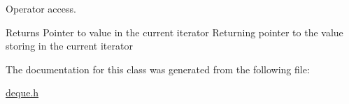 Operator access. 

\begin{DoxyReturn}{Returns}
Pointer to value in the current iterator Returning pointer to the value storing in the current iterator 
\end{DoxyReturn}


The documentation for this class was generated from the following file\+:\begin{DoxyCompactItemize}
\item 
\hyperlink{deque_8h}{deque.\+h}\end{DoxyCompactItemize}
